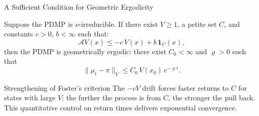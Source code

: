 \documentclass[aspectratio=169]{beamer}
\begin{document}
\begin{frame}{A Sufficient Condition for Geometric Ergodicity}

  \begin{theorem}
    Suppose the PDMP is $\nu$-irreducible. If there exist $V \geq 1$,
    a petite set $C$, and constants $c > 0$, $b < \infty$ such that:
    \[
      \mathcal{A}V(x) \leq -c\,V(x) + b\,\mathbf{1}_C(x),
    \]
    then the PDMP is geometrically ergodic: there exist $C_0 < \infty$
    and $\varrho > 0$ such that
    \[
      \|\mu_t - \pi\|_V \leq C_0\,V(x_0)\,e^{-\varrho t}.
    \]
  \end{theorem}

  \bigskip
  \begin{block}{Strengthening of Foster's criterion}
    The $-cV$ drift forces faster returns to $C$ for states with
    large $V$: the further the process is from $C$, the stronger
    the pull back. This quantitative control on return times
    delivers exponential convergence.
  \end{block}

\end{frame}


\end{document}
